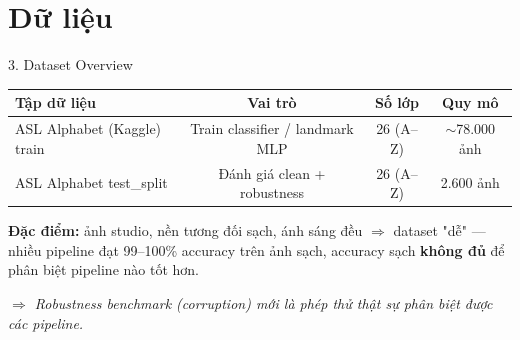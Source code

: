 \documentclass[t, aspectratio=169]{beamer} %
\begin{document}
	\section{Dữ liệu}
	\begin{frame}{3. Dataset Overview}
		\begin{table}
			\centering
			\small
			\begin{tabular}{lccc}
				\toprule
				\textbf{Tập dữ liệu} & \textbf{Vai trò} & \textbf{Số lớp} & \textbf{Quy mô} \\
				\midrule
				ASL Alphabet (Kaggle) train & Train classifier / landmark MLP & 26 (A--Z) & $\sim$78.000 ảnh \\
				ASL Alphabet test\_split & Đánh giá clean + robustness & 26 (A--Z) & 2.600 ảnh \\
				\bottomrule
			\end{tabular}
		\end{table}

		\vspace{1em}
		\textbf{Đặc điểm:} ảnh studio, nền tương đối sạch, ánh sáng đều $\Rightarrow$ \alert{dataset "dễ"} — nhiều pipeline đạt 99--100\% accuracy trên ảnh sạch, accuracy sạch \textbf{không đủ} để phân biệt pipeline nào tốt hơn.

		\vspace{0.5em}
		\textit{$\Rightarrow$ Robustness benchmark (corruption) mới là phép thử thật sự phân biệt được các pipeline.}
	\end{frame}

	\useStyleLogoOnly
	\useThickBar
\end{document}
